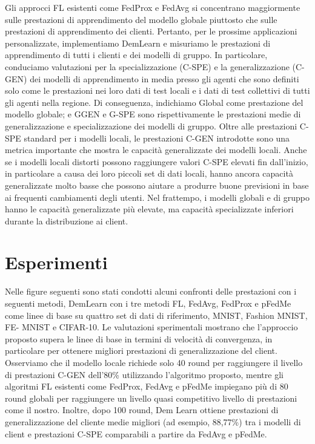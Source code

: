 Gli approcci FL esistenti come FedProx e FedAvg si concentrano maggiormente sulle prestazioni di apprendimento del modello globale piuttosto che sulle prestazioni di apprendimento dei clienti. Pertanto, per le prossime applicazioni personalizzate, implementiamo DemLearn e misuriamo le prestazioni di apprendimento di tutti i clienti e dei modelli di gruppo. In particolare, conduciamo valutazioni per la specializzazione (C-SPE) e la generalizzazione (C-GEN) dei modelli di apprendimento in media presso gli agenti che sono definiti solo come le prestazioni nei loro dati di test locali e i dati di test collettivi di tutti gli agenti nella regione. Di conseguenza, indichiamo Global come prestazione del modello globale; e GGEN e G-SPE sono rispettivamente le prestazioni medie di generalizzazione e specializzazione dei modelli di gruppo. Oltre alle prestazioni C-SPE standard per i modelli locali, le prestazioni C-GEN introdotte sono una metrica importante che mostra le capacità generalizzate dei modelli locali. Anche se i modelli locali distorti possono raggiungere valori C-SPE elevati fin dall'inizio, in particolare a causa dei loro piccoli set di dati locali, hanno ancora capacità generalizzate molto basse che possono aiutare a produrre buone previsioni in base ai frequenti cambiamenti degli utenti. Nel frattempo, i modelli globali e di gruppo hanno le capacità generalizzate più elevate, ma capacità specializzate inferiori durante la distribuzione ai client.

\section{Esperimenti}

Nelle figure seguenti sono stati condotti alcuni confronti delle prestazioni con i seguenti metodi, DemLearn con i tre metodi FL, FedAvg, FedProx e pFedMe come linee di base su quattro set di dati di riferimento, MNIST, Fashion MNIST, FE- MNIST e CIFAR-10. Le valutazioni sperimentali mostrano che l'approccio proposto supera le linee di base in termini di velocità di convergenza, in particolare per ottenere migliori prestazioni di generalizzazione del client. Osserviamo che il modello locale richiede solo 40 round per raggiungere il livello di prestazioni C-GEN dell'80\% utilizzando l'algoritmo proposto, mentre gli algoritmi FL esistenti come FedProx, FedAvg e pFedMe impiegano più di 80 round globali per raggiungere un livello quasi competitivo livello di prestazioni come il nostro. Inoltre, dopo 100 round, Dem Learn ottiene prestazioni di generalizzazione del cliente medie migliori (ad esempio, 88,77\%) tra i modelli di client e prestazioni C-SPE  comparabili a partire da FedAvg e pFedMe.\\\\

